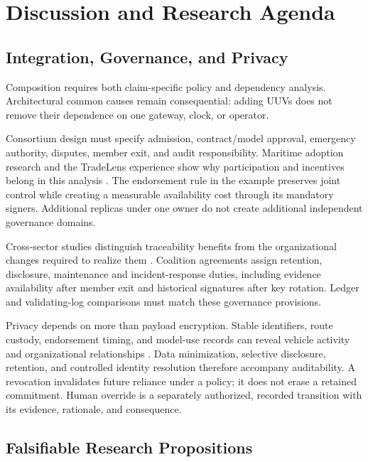 \section{Discussion and Research Agenda}

\subsection{Integration, Governance, and Privacy}

Composition requires both claim-specific policy and dependency analysis. Architectural common causes remain consequential: adding UUVs does not remove their dependence on one gateway, clock, or operator.

Consortium design must specify admission, contract/model approval, emergency authority, disputes, member exit, and audit responsibility. Maritime adoption research and the TradeLens experience show why participation and incentives belong in this analysis \citep{zhou2020key,farah2024survey,maersk2022tradelens}. The endorsement rule in the example preserves joint control while creating a measurable availability cost through its mandatory signers. Additional replicas under one owner do not create additional independent governance domains.

Cross-sector studies distinguish traceability benefits from the organizational changes required to realize them \citep{kshetri20181,lnes2017blockchain}. Coalition agreements assign retention, disclosure, maintenance and incident-response duties, including evidence availability after member exit and historical signatures after key rotation. Ledger and validating-log comparisons must match these governance provisions.

Privacy depends on more than payload encryption. Stable identifiers, route custody, endorsement timing, and model-use records can reveal vehicle activity and organizational relationships \citep{reyna2018blockchain,kshetri2017can}. Data minimization, selective disclosure, retention, and controlled identity resolution therefore accompany auditability. A revocation invalidates future reliance under a policy; it does not erase a retained commitment. Human override is a separately authorized, recorded transition with its evidence, rationale, and consequence.

\subsection{Falsifiable Research Propositions}\label{sec:propositions}

